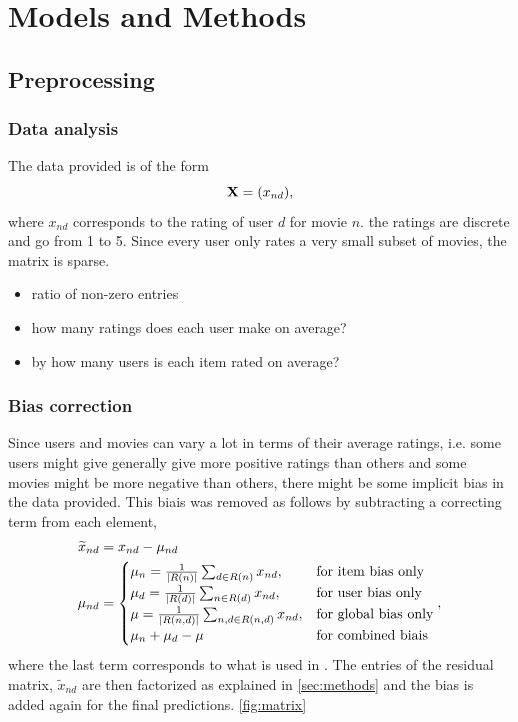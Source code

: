 \section{Models and Methods}

\subsection{Preprocessing}
\subsubsection{Data analysis}

The data provided is of the form 
\begin{equation}
  \mathbf{X} = (x_{nd}),
\end{equation}
where $x_{nd}$ corresponds to the rating of user $d$ for movie $n$.  
the ratings are discrete and go from 1 to 5. Since every user only rates a
very small subset of movies, the matrix is sparse.

\begin{itemize}
  \item ratio of non-zero entries
  \item how many ratings does each user make on average?
  \item by how many users is each item rated on average? 
\end{itemize}

\subsubsection{Bias correction}
\label{sec:biascorrection}

Since users and movies can vary a lot in terms of their average ratings, i.e. some
users might give generally give more positive ratings than others and some
movies might be more negative than others, there might be some implicit bias in
the data provided. 
This biais was removed as follows by subtracting a correcting term from each
element,
\begin{align}
  \widetilde{x}_{nd} &= x_{nd}-\mu_{nd} \\
  \mu_{nd} &=
 \begin{cases}
  \mu_{n} = \frac{1}{|R(n)|} \sum_{d \in R(n)} x_{nd}, &\text{for item bias only}   \\
\mu_{d} = \frac{1}{|R(d)|} \sum_{n \in R(d)} x_{nd}, &\text{for user bias only} \\
\mu = \frac{1}{|R(n,d)|}\sum_{n,d \in R(n,d)} x_{nd}, &\text{for global bias only}
   \\
  \mu_{n} + \mu_{d} - \mu &\text{for combined biais}
 \end{cases}, 
\end{align}
where the last term corresponds to what is used in \cite{Koren2009}. 
The entries of the residual matrix, $\widetilde{x}_{nd}$ are then factorized as explained
in \ref{sec:methods} and the bias is added again for the final predictions.
\ref{fig:matrix}

